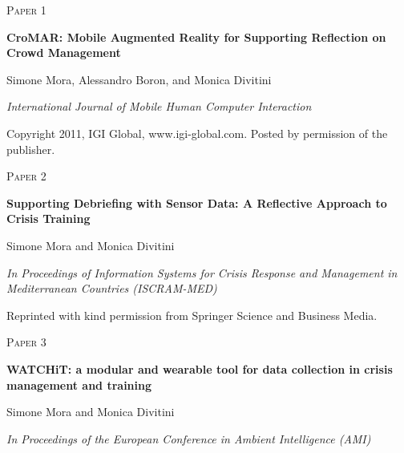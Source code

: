 \cleardoublepage
\begin{flushright}
\textsc{\huge Paper 1}
\end{flushright}
\vspace{3cm}
\begin{center}
	\begin{framed}
		{\Large \textbf{CroMAR: Mobile Augmented Reality for Supporting Reflection on Crowd Management}}	
		\medskip
		
		Simone Mora, Alessandro Boron, and Monica Divitini
		
		\medskip		
		\emph{International Journal of Mobile Human Computer Interaction}
	\end{framed}	
\end{center}
\vspace{11cm}
\scriptsize Copyright 2011, IGI Global, www.igi-global.com. Posted by permission of the publisher.

\cleardoublepage


\cleardoublepage
\begin{flushright}
\textsc{\huge Paper 2}
\end{flushright}
\vspace{3cm}
\begin{center}
	\begin{framed}
		{\Large \textbf{Supporting Debriefing with Sensor Data: A Reflective Approach to Crisis Training}}	
		\medskip
		
		Simone Mora and Monica Divitini
		
		\medskip		
		\emph{In Proceedings of Information Systems for Crisis Response and Management in Mediterranean Countries (ISCRAM-MED)}
	\end{framed}	
\end{center}

\vspace{11cm}
\scriptsize Reprinted with kind permission from Springer Science and Business Media.

\cleardoublepage


\cleardoublepage
\begin{flushright}
\textsc{\huge Paper 3}
\end{flushright}
\vspace{3cm}
\begin{center}
	\begin{framed}
		{\Large \textbf{WATCHiT: a modular and wearable tool for data collection in crisis management and training}}	
		\medskip
		
		Simone Mora and Monica Divitini
		
		\medskip		
		\emph{In Proceedings of the European Conference in Ambient Intelligence (AMI)}
	\end{framed}	
\end{center}

